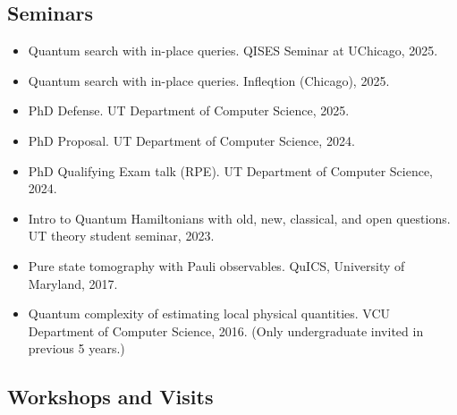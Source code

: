 \documentclass[11pt,letterpaper,serif]{moderncv}
\begin{document}
\smallskip
\subsection{Seminars}

\begin{itemize}
	\item[\textbullet] Quantum search with in-place queries.\quad
	QISES Seminar at UChicago, 2025.

	\item[\textbullet] Quantum search with in-place queries.\quad
	Infleqtion (Chicago), 2025.

	\item[\textbullet] PhD Defense.\quad
	UT Department of Computer Science, 2025.

	\item[\textbullet] PhD Proposal.\quad
	UT Department of Computer Science, 2024.

	\item[\textbullet] PhD Qualifying Exam talk (RPE).\quad
	UT Department of Computer Science, 2024.

	\item[\textbullet] Intro to Quantum Hamiltonians with old, new, classical, and open questions.\quad
	UT theory student seminar, 2023.

	\item[\textbullet] Pure state tomography with Pauli observables.\quad
	QuICS, University of Maryland, 2017.

	\item[\textbullet] Quantum complexity of estimating local physical quantities.\quad
	VCU Department of Computer Science, 2016.\quad
	(Only undergraduate invited in previous 5 years.)
\end{itemize}

\smallskip
\subsection{Workshops and Visits}
\end{document}
